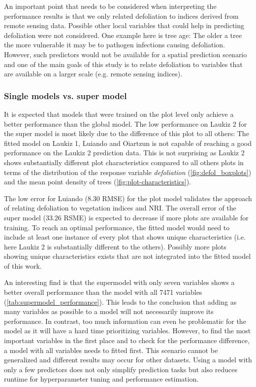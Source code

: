 \documentclass[review]{elsarticle}
\begin{document}
An important point that needs to be considered when interpreting the performance results is that we only related defoliation to indices derived from remote sensing data.
Possible other local variables that could help in predicting defoliation were not considered.
One example here is tree age: The older a tree the more vulnerable it may be to pathogen infections causing defoliation.
However, such predictors would not be available for a spatial prediction scenario and one of the main goals of this study is to relate defoliation to variables that are available on a larger scale (e.g. remote sensing indices).

\subsubsection{Single models vs. super model}

It is expected that models that were trained on the plot level only achieve a better performance than the global model.
The low performance on Laukiz 2 for the super model is most likely due to the difference of this plot to all others: The fitted model on Laukiz 1, Luiando and Oiartzun is not capable of reaching a good performance on the Laukiz 2 prediction data.
This is not surprising as Laukiz 2 shows substantially different plot characteristics compared to all others plots in terms of the distribution of the response variable \textit{defoliation} (\autoref{fig:defol_boxplots}) and the mean point density of trees (\autoref{fig:plot-characteristics}).

The low error for Luiando (8.30 RMSE) for the plot model validates the approach of relating defoliation to vegetation indices and NRI.
The overall error of the super model (33.26 RSME) is expected to decrease if more plots are available for training.
To reach an optimal performance, the fitted model would need to include at least one instance of every plot that shows unique characteristics (i.e. here Laukiz 2 is substantially different to the others).
Possibly more plots showing unique characteristics exists that are not integrated into the fitted model of this work.

An interesting find is that the supermodel with only seven variables shows a better overall performance than the model with all 7471 variables (\autoref{tab:supermodel_performance}).
This leads to the conclusion that adding as many variables as possible to a model will not necessarily improve its performance.
In contrast, too much information can even be problematic for the model as it will have a hard time prioritizing variables.
However, to find the most important variables in the first place and to check for the performance difference, a model with all variables needs to fitted first.
This scenario cannot be generalized and different results may occur for other datasets.
Using a model with only a few predictors does not only simplify prediction tasks but also reduces runtime for hyperparameter tuning and performance estimation.
\end{document}
